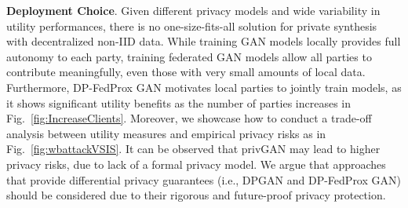 \documentclass[conference]{IEEEtran}
\newcommand{\partitle}[1]{\smallskip \noindent \textbf{#1}.}
\begin{document}






\partitle{Deployment Choice} %
Given different privacy models and wide variability in utility performances, there is no one-size-fits-all solution for private synthesis with decentralized non-IID data. While training GAN models locally provides full autonomy to each party, training federated GAN models allow all parties to contribute meaningfully, even those with very small amounts of local data. Furthermore, DP-FedProx GAN motivates local parties to jointly train models, as it shows significant utility benefits as the number of parties increases in Fig.~\ref{fig:IncreaseClients}.     Moreover, we showcase how to conduct a trade-off analysis between utility measures and empirical privacy risks as in Fig.~\ref{fig:wbattackVSIS}. It can be observed that privGAN may lead to higher privacy risks, due to lack of a formal privacy model. We argue that approaches that provide differential privacy guarantees {(i.e., DPGAN and DP-FedProx GAN)} should be considered due to their rigorous and future-proof privacy protection.  




\end{document}
